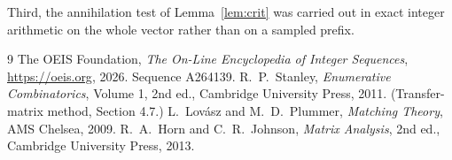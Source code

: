 \documentclass[11pt,a4paper]{article}
\theoremstyle{plain}
\theoremstyle{definition}
\begin{document}
Third, the annihilation test of Lemma~\ref{lem:crit} was carried out in exact integer
arithmetic on the whole vector rather than on a sampled prefix.

\begin{thebibliography}{9}
 The OEIS Foundation, \emph{The On-Line Encyclopedia of Integer
Sequences}, \url{https://oeis.org}, 2026. Sequence A264139.
 R.~P.~Stanley, \emph{Enumerative Combinatorics}, Volume 1, 2nd ed.,
Cambridge University Press, 2011. (Transfer-matrix method, Section 4.7.)
 L.~Lov\'asz and M.~D.~Plummer, \emph{Matching Theory}, AMS Chelsea, 2009.
 R.~A.~Horn and C.~R.~Johnson, \emph{Matrix Analysis}, 2nd ed., Cambridge
University Press, 2013.
\end{thebibliography}
\end{document}
